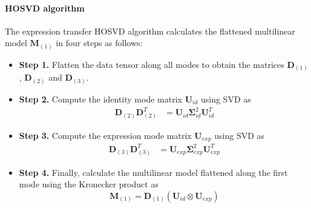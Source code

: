 \documentclass[11pt,a4paper]{report}
\begin{document}
\paragraph{HOSVD algorithm} The expression transfer HOSVD algorithm calculates
the flattened multilinear model $\mathbf{M}_{(1)}$ in four steps as follows:
\begin{itemize}
\item \textbf{Step 1.} Flatten the data tensor along all modes to obtain the
  matrices $\mathbf{D}_{(1)}$, $\mathbf{D}_{(2)}$ and $\mathbf{D}_{(3)}$.
\item \textbf{Step 2.} Compute the identity mode matrix $\mathbf{U}_{id}$ using
  SVD as
\begin{align}\label{eq:hosvdsvdi}
\mathbf{D}_{(2)}\mathbf{D}_{(2)}^T &= \mathbf{U}_{id} \mathbf{\Sigma}_{id}^2 \mathbf{U}_{id}^T
\end{align}
\item \textbf{Step 3.} Compute the expression mode matrix $\mathbf{U}_{exp}$ using
  SVD as
\begin{align}\label{eq:hosvdsvde}
\mathbf{D}_{(3)}\mathbf{D}_{(3)}^T &= \mathbf{U}_{exp} \mathbf{\Sigma}_{exp}^2 \mathbf{U}_{exp}^T
\end{align}
\item \textbf{Step 4.} Finally, calculate the multilinear model flattened along
  the first mode using the Kronecker product as
\begin{equation}
\mathbf{M}_{(1)} = \mathbf{D}_{(1)} (\mathbf{U}_{id} \otimes \mathbf{U}_{exp})
\end{equation}
\end{itemize}
\end{document}
